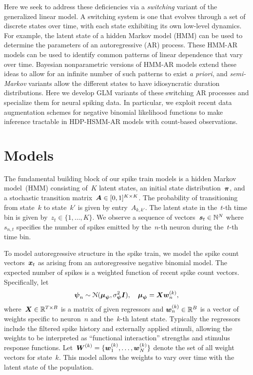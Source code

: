 \documentclass[aos,noinfoline]{imsart} %
\begin{document}
Here we seek to address these deficiencies via a \emph{switching} variant of the generalized linear model.  A switching system is one that evolves through a set of discrete states over time, with each state exhibiting its own low-level dynamics.  For example, the latent state of a hidden Markov model (HMM) can be used to determine the parameters of an autoregressive (AR) process.  These HMM-AR models can be used to identify common patterns of linear dependence that vary over time. Bayesian nonparametric versions of HMM-AR models extend these ideas to allow for an infinite number of such patterns to exist \emph{a priori}, and \emph{semi-Markov} variants allow the different states to have idiosyncratic duration distributions.  Here we develop GLM variants of these switching AR processes and specialize them for neural spiking data.  In particular, we exploit recent data augmentation schemes for negative binomial likelihood functions \cite{Pillow-2012} to make inference tractable in HDP-HSMM-AR models with count-based observations.

\section{Models}
The fundamental building block of our spike train models is a hidden Markov model~(HMM) consisting of~$K$ latent states, an initial state distribution~$\boldsymbol{\pi}$, and a stochastic transition matrix~${\boldsymbol{A}\in [0,1]^{K\times K}}$. The probability of transitioning from state~$k$ to state~$k'$ is given by entry~${A_{k,k'}}$. The latent state in the~$t$-th time bin is given by~${z_t\in\{1,\ldots,K\}}$. We observe a sequence of vectors~${\boldsymbol{s}_t\in\mathbb{N}^N}$ where~$s_{n,t}$ specifies the number of spikes emitted by the~$n$-th neuron during the~$t$-th time bin. 

To model autoregressive structure in the spike train, we model the spike count vectors~$\boldsymbol{x}_t$ as arising from an autoregressive negative binomial model. The expected number of spikes is a weighted function of recent spike count vectors. Specifically, let 
\begin{align}
\bpsi_{n} \sim \distNormal(\bmu_{\bpsi}, \sigma_{\bpsi}^2 \bI),
\quad
\bmu_{\bpsi} = \bX \bw_{n}^{(k)},
\end{align}
where~${\boldsymbol{X}\in \mathbb{R}^{T\times B}}$ is a matrix of given regressors and ${\boldsymbol{w}_{n}^{(k)}\in \mathbb{R}^B}$ is a vector of weights specific to neuron~$n$ and the~$k$-th latent state. Typically the regressors include the filtered spike history and externally applied stimuli, allowing the weights to be interpreted as ``functional interaction'' strengths and stimulus response functions. Let~${\boldsymbol{W}^{(k)}=\{\boldsymbol{w}_1^{(k)},\ldots,\boldsymbol{w}_N^{(k)}\}}$ denote the set of all weight vectors for state~$k$. This model allows the weights to vary over time with the latent state of the population.
\end{document}
